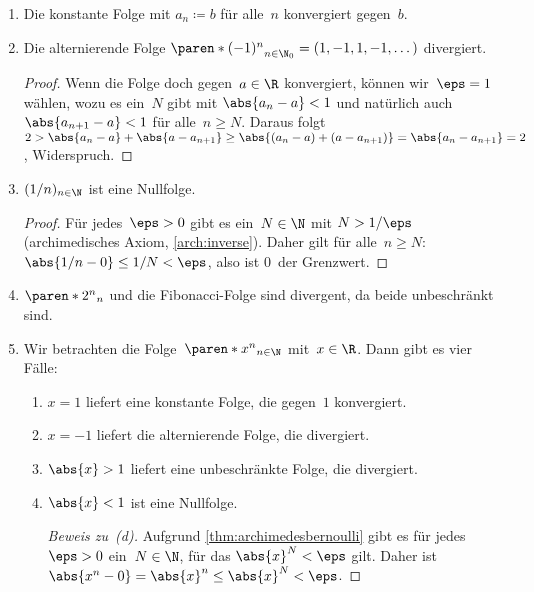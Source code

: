 \documentclass[a4paper]{article}
\begin{document}
\begin{example}\leavevmode
    \begin{enumerate}
        \item Die konstante Folge mit $a_n \coloneqq b$ für alle~$n$ konvergiert gegen~$b$.
        \item Die alternierende Folge $\paren*{(-1)^n}_{n \in \N_0} = (1, -1, 1, -1, \dots)$ divergiert.
              \begin{proof}
                  Wenn die Folge doch gegen~$a \in \R$ konvergiert, können wir~$\eps = 1$ wählen, wozu es ein~$N$ gibt mit $\abs{a_n-a} < 1$ und natürlich auch $\abs{a_{n+1}-a} < 1$ für alle~$n \geq N$. Daraus folgt $2 > \abs{a_n-a} + \abs{a-a_{n+1}} \geq \abs{(a_n-a) + (a-a_{n+1})} = \abs{a_n-a_{n+1}} = 2$, Widerspruch.
              \end{proof}
        \item $(1/n)_{n \in \N}$ ist eine Nullfolge.
              \begin{proof}
                  Für jedes~$\eps > 0$ gibt es ein~$N \in \N$ mit $N > 1/\eps$ (archimedisches Axiom, \cref{arch:inverse}). Daher gilt für alle~$n \geq N$: $\abs{1/n-0} \leq 1/N < \eps$, also ist 0~der Grenzwert.
              \end{proof}
        \item $\paren*{2^n}_n$ und die Fibonacci-Folge sind divergent, da beide unbeschränkt sind.
        \item Wir betrachten die Folge~$\paren*{x^n}_{n\in\N}$ mit~$x \in \R$. Dann gibt es vier Fälle:
              \begin{enumerate}
                  \item $x = 1$ liefert eine konstante Folge, die gegen~$1$ konvergiert.
                  \item $x = -1$ liefert die alternierende Folge, die divergiert.
                  \item $\abs{x} > 1$ liefert eine unbeschränkte Folge, die divergiert.
                  \item $\abs{x} < 1$ ist eine Nullfolge.
                        \begin{proof}[Beweis zu~(d)]
                            Aufgrund \cref{thm:archimedesbernoulli} gibt es für jedes~$\eps > 0$ ein~$N \in \N$, für das $\abs{x}^N < \eps$ gilt. Daher ist $\abs{x^n-0} = \abs{x}^n \leq \abs{x}^N < \eps$.
                        \end{proof}
              \end{enumerate}
    \end{enumerate}
\end{example}
\end{document}
